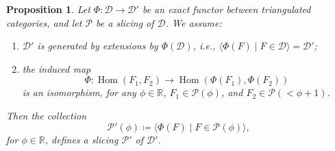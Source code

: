 \documentclass[11pt, reqno]{amsart}
\numberwithin{equation}{section}
\theoremstyle{plain}
\newtheorem{proposition}[theorem]{Proposition}
\theoremstyle{remark}
\theoremstyle{definition}
\theoremstyle{italicsname}
\newcommand{\st}{\mid}
\DeclareMathOperator{\Hom}{Hom}
\newcommand{\cD}{\mathscr{D}}
\newcommand{\cP}{\mathscr{P}}
\def\RR{\ensuremath{\mathbb{R}}}
\begin{document}
\begin{proposition}\label{prop:extendslicing}
Let $\Phi\colon\cD\to\cD'$ be an exact functor between triangulated categories, and let $\cP$ be a slicing of $\cD$. 
We assume:
\begin{enumerate}[{\rm (i)}]
    \item\label{enum:extendslicing1} $\cD'$ is generated by extensions by $\Phi(\cD)$, i.e., $\langle\Phi(F)\st F\in\cD\rangle=\cD'$;
    \item\label{enum:extendslicing2} the induced map
    \[
    \Phi\colon\Hom(F_1,F_2)\longrightarrow\Hom\left(\Phi(F_1),\Phi(F_2)\right)
    \]
    is an isomorphism, for any $\phi\in\RR$, $F_1\in\cP(\phi)$, and
    $F_2\in \cP(<\phi+1)$.
\end{enumerate}
Then the collection
\begin{equation}\label{eq:cP'}
\cP'(\phi)\coloneqq\langle\Phi(F)\st F\in\cP(\phi)\rangle,
\end{equation}
for $\phi\in\RR$, defines a slicing $\cP'$ of $\cD'$. 
\end{proposition}
\end{document}
